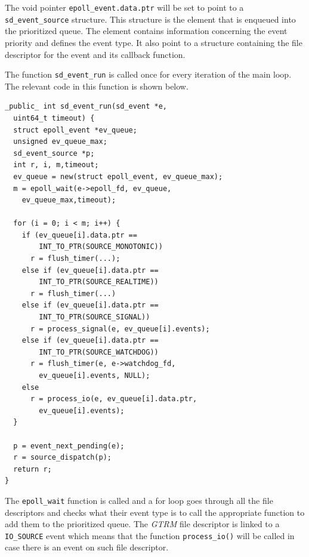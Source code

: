 \documentclass[nobiblatex]{LTHthesis}
\begin{document}
The void pointer \texttt{epoll\_event.data.ptr} will be set to point to a 
\texttt{sd\_event\_source} structure. This structure is the element that is
enqueued into the prioritized queue. The element contains information
concerning the event priority and defines the event type. It also point to
a structure containing the file descriptor for the event and its callback
function.

The function \texttt{sd\_event\_run} is called once for every iteration of
the main loop. The relevant code in this function is shown below.
\begin{lstlisting}
_public_ int sd_event_run(sd_event *e, 
  uint64_t timeout) {
  struct epoll_event *ev_queue;
  unsigned ev_queue_max;
  sd_event_source *p;
  int r, i, m,timeout;        
  ev_queue = new(struct epoll_event, ev_queue_max);
  m = epoll_wait(e->epoll_fd, ev_queue, 
    ev_queue_max,timeout);

  for (i = 0; i < m; i++) {
    if (ev_queue[i].data.ptr == 
        INT_TO_PTR(SOURCE_MONOTONIC))
      r = flush_timer(...);
    else if (ev_queue[i].data.ptr == 
        INT_TO_PTR(SOURCE_REALTIME))
      r = flush_timer(...)
    else if (ev_queue[i].data.ptr == 
        INT_TO_PTR(SOURCE_SIGNAL))
      r = process_signal(e, ev_queue[i].events);
    else if (ev_queue[i].data.ptr == 
        INT_TO_PTR(SOURCE_WATCHDOG))
      r = flush_timer(e, e->watchdog_fd, 
        ev_queue[i].events, NULL);
    else
      r = process_io(e, ev_queue[i].data.ptr, 
        ev_queue[i].events);
  }

  p = event_next_pending(e);
  r = source_dispatch(p);
  return r;
}
\end{lstlisting}

The \texttt{epoll\_wait} function is called and a for loop goes through 
all the file descriptors and checks what their event type is to call the
appropriate function to add them to the prioritized queue.
The \emph{GTRM} file descriptor is linked to a \texttt{IO\_SOURCE} event which 
means that the function \texttt{process\_io()} will be called in case there
is an event on such file descriptor.
\end{document}

